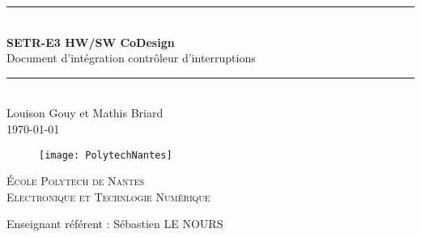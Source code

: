 \newcommand{\HRule}{\rule{\linewidth}{0.5mm}} %

\begin{center} %
	\HRule \\[0.2cm] %
	\Large
	\textbf{SETR-E3 HW/SW CoDesign}\\ %
	\vspace{1cm}
Document d'intégration contrôleur d'interruptions \\

	\large
	\HRule \\[1.5cm] %
	\normalsize
	Louison Gouy et Mathis Briard\\
	\today %
\end{center}

\begin{figure}[H] %
	\centering
	\texttt{[image: PolytechNantes]}
\end{figure}

\vspace{1cm}

\begin{center}\large %
	\textsc{École Polytech de Nantes}\\
	\textsc{Electronique et Technlogie Numérique}
\end{center}

\vspace{1cm}

\noindent
Enseignant référent : Sébastien LE NOURS 
\vspace{1cm}

\tableofcontents